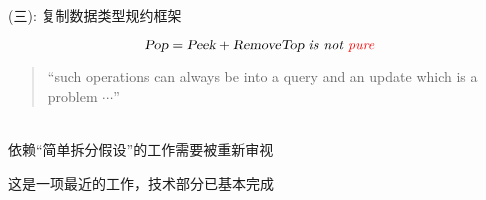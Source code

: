 \begin{frame}{(三): 复制数据类型规约框架}
  \begin{center}
  \end{center}

  \[
    {\textsl{Pop} = \textsl{Peek} + \textsl{RemoveTop}}\; \textrm{\it is not \textcolor{red}{pure}}
  \]

  \pause
  \begin{quote}
    {\small ``such operations can always be  into a query and an update
    which is  a problem $\cdots$''~}
  \end{quote}

  \begin{center}
     \\[3pt]
    依赖``简单拆分假设''的工作需要被重新审视
  \end{center}

  \pause
  \vspace{0.10cm}
  \begin{center}
    这是一项最近的工作，技术部分已基本完成
  \end{center}
\end{frame}
